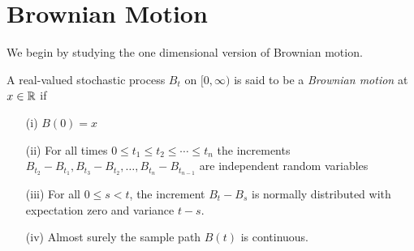 \section{Brownian Motion}
We begin by studying the one dimensional version of Brownian motion.
\begin{defn}A real-valued stochastic process $B_t$ on $[0, \infty)$ is said to be a
  \emph{Brownian motion} at $x \in \mathbb{R}$ if 
\begin{itemize}
\item[(i)]$B(0) = x$
\item[(ii)]For all times $0 \leq t_1 \leq t_2 \leq \cdots \leq t_n$
  the increments $B_{t_2} - B_{t_1}, B_{t_3} - B_{t_2}, \dots, B_{t_n}
  - B_{t_{n-1}}$ are independent random variables
\item[(iii)]For all $0 \leq s < t$, the increment $B_t - B_s$ is normally distributed with
  expectation zero and variance $t - s$.
\item[(iv)]Almost surely the sample path $B(t)$ is continuous.
\end{itemize}
\end{defn}

